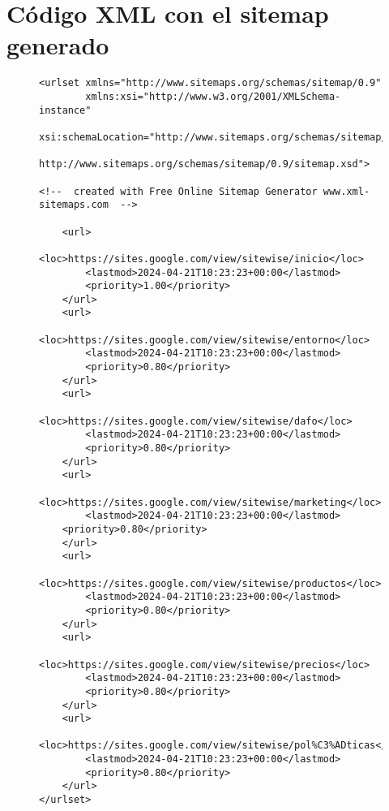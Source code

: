 \section{Código XML con el sitemap generado}
\begin{figure}[H]
    \begin{tcolorbox}[sharp corners, colback=yellow!30, colframe=white!20]
        \scriptsize
        \begin{verbatim}
<urlset xmlns="http://www.sitemaps.org/schemas/sitemap/0.9"
        xmlns:xsi="http://www.w3.org/2001/XMLSchema-instance"
       xsi:schemaLocation="http://www.sitemaps.org/schemas/sitemap/0.9
                           http://www.sitemaps.org/schemas/sitemap/0.9/sitemap.xsd">

<!--  created with Free Online Sitemap Generator www.xml-sitemaps.com  -->

    <url>
        <loc>https://sites.google.com/view/sitewise/inicio</loc>
        <lastmod>2024-04-21T10:23:23+00:00</lastmod>
        <priority>1.00</priority>
    </url>
    <url>
        <loc>https://sites.google.com/view/sitewise/entorno</loc>
        <lastmod>2024-04-21T10:23:23+00:00</lastmod>
        <priority>0.80</priority>
    </url>
    <url>
        <loc>https://sites.google.com/view/sitewise/dafo</loc>
        <lastmod>2024-04-21T10:23:23+00:00</lastmod>
        <priority>0.80</priority>
    </url>
    <url>
        <loc>https://sites.google.com/view/sitewise/marketing</loc>
        <lastmod>2024-04-21T10:23:23+00:00</lastmod>
    <priority>0.80</priority>
    </url>
    <url>
        <loc>https://sites.google.com/view/sitewise/productos</loc>
        <lastmod>2024-04-21T10:23:23+00:00</lastmod>
        <priority>0.80</priority>
    </url>
    <url>
        <loc>https://sites.google.com/view/sitewise/precios</loc>
        <lastmod>2024-04-21T10:23:23+00:00</lastmod>
        <priority>0.80</priority>
    </url>
    <url>
        <loc>https://sites.google.com/view/sitewise/pol%C3%ADticas</loc>
        <lastmod>2024-04-21T10:23:23+00:00</lastmod>
        <priority>0.80</priority>
    </url>
</urlset>
        \end{verbatim}
    \end{tcolorbox}
\end{figure}


%
%

